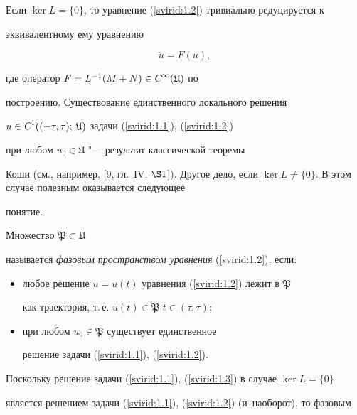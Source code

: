 Если $\ker L=\{0\}$, то уравнение (\ref{svirid:1.2}) тривиально редуцируется к

эк\-ви\-ва\-лент\-но\-му ему уравнению

\begin{equation}\label{svirid:1.3}

\dot{u}=F(u),

\end{equation}

где оператор $F=L^{-1}(M+N)\in\textsl{C}^\infty(\mathfrak{U})$ по

построению. Существование единст\-вен\-но\-го локального решения

$u\in\textsl{C}^1((-\tau, \tau);\,\mathfrak{U})$ задачи (\ref{svirid:1.1}), (\ref{svirid:1.2})

при любом $u_0\in\mathfrak{U}$ "--- результат классической теоремы

Коши (см., например, [9, гл.~IV, $\S 1$]). Другое дело, если $\ker

L\neq \{0\}$. В этом случае полезным оказывается следующее

понятие.

\begin{definition}[1.1]

Множество $\mathfrak{P}\subset\mathfrak{U}$

называется {\it фазовым пространством урав\-не\-ния} (\ref{svirid:1.2}), если:



\begin{itemize}

    \item [(i)] любое решение $u=u(t)$ уравнения (\ref{svirid:1.2}) лежит в $\mathfrak{P}$

как траектория, т.\,е. $u(t)\in\mathfrak{P}$ $t\in(\tau, \tau)$;

    \item [(ii)] при любом $u_0\in\mathfrak{P}$ существует единственное

решение задачи (\ref{svirid:1.1}), (\ref{svirid:1.2}).

\end{itemize}

\end{definition}



Поскольку решение задачи (\ref{svirid:1.1}), (\ref{svirid:1.3}) в случае $\ker L=\{0\}$

яв\-ля\-ет\-ся решением задачи (\ref{svirid:1.1}), (\ref{svirid:1.2}) (и~наоборот), то фазовым

